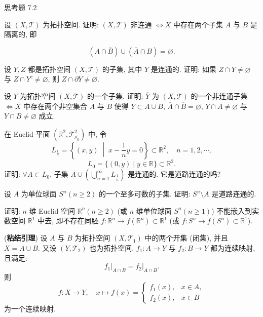 \begin{exblock}{思考题 7.2}
  \item 设 $(X, \mathcal{T})$ 为拓扑空间. 证明: $(X, \mathcal{T})$ 非连通 $\iff X$ 中存在两个子集 $A$ 与 $B$ 是隔离的, 即

  \[
    (A \cap \overline{B}) \cup (\overline{A} \cap B) = \varnothing.
  \]

  \item 设 $Y, Z$ 都是拓扑空间 $(X, \mathcal{T})$ 的子集, 其中 $Y$ 是连通的. 证明: 如果 $Z \cap Y \neq \varnothing$ 与 $Z \cap Y^c \neq \varnothing$, 则 $Z \cap \partial Y \neq \varnothing$.

  \item 设 $Y$ 为拓扑空间 $(X, \mathcal{T})$ 的一个子集. 证明: $\overline{Y}$ 为 $(X, \mathcal{T})$ 的一个非连通子集 $\iff X$ 中存在两个非空集合 $A$ 与 $B$ 使得 $Y \subset A \cup B$, $\overline{A} \cap \overline{B} = \varnothing$, $Y \cap A \neq \varnothing$ 与 $Y \cap B \neq \varnothing$ 成立.

  \item 在 Euclid 平面 $(\mathbb{R}^{2}, \mathcal{T}_{\rho_{0}}^{2})$ 中, 令
  \[
    L_{\frac{1}{n}} = \left\{(x,y) \;\middle|\; x - \frac{1}{n}y = 0\right\} \subset \mathbb{R}^{2}, \quad n = 1, 2, \cdots,
  \]
  \[
    L_{0} = \{(0,y) \mid y \in \mathbb{R}\} \subset \mathbb{R}^{2}.
  \]
  证明: $\forall A \subset L_{0}$, 子集 $A \cup \left(\bigcup\limits_{n=1}^{\infty} L_{\frac{1}{n}}\right)$ 是连通的. 它是道路连通的吗?

  \item 设 $A$ 为单位球面 $S^{n} (n \geqslant 2)$ 的一个至多可数的子集. 证明: $S^{n} \setminus A$ 是道路连通的.

  \item 证明: $n$ 维 Euclid 空间 $\mathbb{R}^n (n \geqslant 2)$ (或 $n$ 维单位球面 $S^n (n \geqslant 1)$) 不能嵌入到实数空间 $\mathbb{R}^1$ 中去, 即不存在同胚 $f\colon \mathbb{R}^n \to f(\mathbb{R}^n) \subset \mathbb{R}^1$ (或 $f\colon S^n \to f(S^n) \subset \mathbb{R}^1$).

  \item (\textbf{粘结引理}) 设 $A$ 与 $B$ 为拓扑空间 $(X, \mathcal{T}_{1})$ 中的两个开集 (闭集), 并且 $X = A \cup B$. 又设 $(Y, \mathcal{T}_{2})$ 也为拓扑空间, $f_{1}\colon A \to Y$ 与 $f_{2}\colon B \to Y$ 都为连续映射, 且满足:
  \[
    f_{1}\big|_{A \cap B} = f_{2}\big|_{A \cap B}.
  \]
  则
  \[
    f\colon X \to Y, \quad x \mapsto f(x) = \begin{cases}
      f_{1}(x), & x \in A, \\
      f_{2}(x), & x \in B
    \end{cases}
  \]
  为一个连续映射.


\end{exblock}
